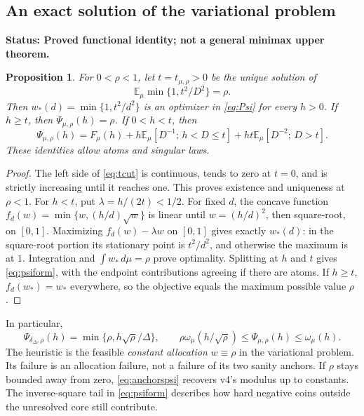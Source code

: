 \documentclass[11pt]{article}
\newtheorem{proposition}[theorem]{Proposition}
\theoremstyle{definition}\newtheorem{conjecture}[theorem]{Conjecture}
\theoremstyle{remark}\newtheorem{remark}[theorem]{Remark}
\newcommand{\E}{\mathbb E}\newcommand{\PP}{\mathbb P}\newcommand{\R}{\mathbb R}
\newcommand{\status}[1]{\par\smallskip\noindent\textbf{Status: #1.}\par}
\begin{document}
\subsection{An exact solution of the variational problem}
\status{Proved functional identity; not a general minimax upper theorem}
\begin{proposition}\label{prop:optimizer}
For $0<\rho<1$, let $t=t_{\mu,\rho}>0$ be the unique solution of
\begin{equation}\label{eq:tcut}
 \E_\mu\min\{1,t^2/D^2\}=\rho.
\end{equation}
Then $w_*(d)=\min\{1,t^2/d^2\}$ is an optimizer in \eqref{eq:Psi} for every $h>0$. If $h\ge t$, then $\Psi_{\mu,\rho}(h)=\rho$. If $0<h<t$, then
\begin{equation}\label{eq:psiform}
 \Psi_{\mu,\rho}(h)=F_\mu(h)
 +h\E_\mu[D^{-1};\,h<D\le t]
 +ht\E_\mu[D^{-2};\,D>t].
\end{equation}
These identities allow atoms and singular laws.
\end{proposition}
\begin{proof}
The left side of \eqref{eq:tcut} is continuous, tends to zero at $t=0$, and is strictly increasing until it reaches one. This proves existence and uniqueness at $\rho<1$.
For $h<t$, put $\lambda=h/(2t)<1/2$. For fixed $d$, the concave function
$f_d(w)=\min\{w,(h/d)\sqrt w\}$ is linear until $w=(h/d)^2$, then square-root, on $[0,1]$. Maximizing $f_d(w)-\lambda w$ on $[0,1]$ gives exactly $w_*(d)$: in the square-root portion its stationary point is $t^2/d^2$, and otherwise the maximum is at $1$. Integration and $\int w_*\,d\mu=\rho$ prove optimality. Splitting at $h$ and $t$ gives \eqref{eq:psiform}, with the endpoint contributions agreeing if there are atoms. If $h\ge t$, $f_d(w_*)=w_*$ everywhere, so the objective equals the maximum possible value $\rho$.
\end{proof}

In particular,
\begin{equation}\label{eq:anchorspsi}
 \Psi_{\delta_\Delta,\rho}(h)=\min\{\rho,h\sqrt\rho/\Delta\},\qquad
 \rho\omega_\mu(h/\sqrt\rho)\le\Psi_{\mu,\rho}(h)\le\omega_\mu(h).
\end{equation}
The heuristic is the feasible \emph{constant allocation} $w\equiv\rho$ in the variational problem. Its failure is an allocation failure, not a failure of its two sanity anchors. If $\rho$ stays bounded away from zero, \eqref{eq:anchorspsi} recovers v4's modulus up to constants. The inverse-square tail in \eqref{eq:psiform} describes how hard negative coins outside the unresolved core still contribute.
\end{document}
